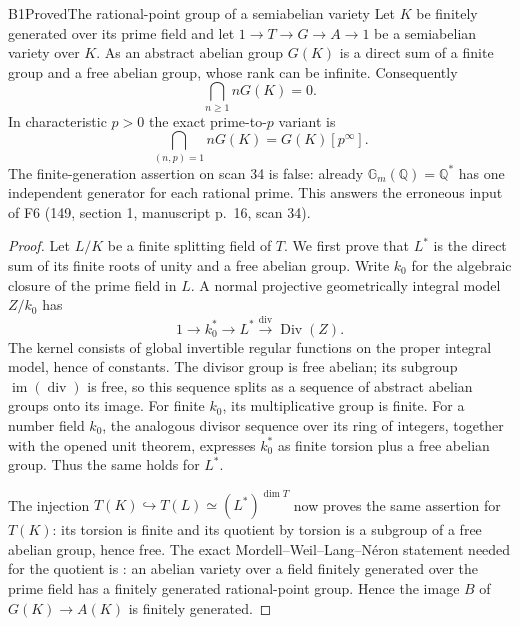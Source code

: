 \begin{result}{B1}{Proved}{The rational-point group of a semiabelian variety}
\label{res:B1}
Let $K$ be finitely generated over its prime field and let
$1\to T\to G\to A\to1$ be a semiabelian variety over $K$.
As an abstract abelian group $G(K)$ is a direct sum of a finite group and
a free abelian group, whose rank can be infinite. Consequently
\[
 \bigcap_{n\geq1}nG(K)=0.
\]
In characteristic $p>0$ the exact prime-to-$p$ variant is
\[
 \bigcap_{(n,p)=1}nG(K)=G(K)[p^\infty].
\]
The finite-generation assertion on scan 34 is false: already
$\mathbb G_m(\mathbb Q)=\mathbb Q^*$ has one independent generator for
each rational prime. This answers the erroneous input of F6 (149,
section 1, manuscript p.~16, scan 34).
\end{result}
\begin{proof}
Let $L/K$ be a finite splitting field of $T$. We first prove that
$L^*$ is the direct sum of its finite roots of unity and a free abelian
group. Write $k_0$ for the algebraic closure of the prime field in $L$.
A normal projective geometrically integral model $Z/k_0$ has
\[
 1\longrightarrow k_0^*\longrightarrow L^*
 \xrightarrow{\operatorname{div}}\operatorname{Div}(Z).
\]
The kernel consists of global invertible regular functions on the proper
integral model, hence of constants. The divisor group is free abelian;
its subgroup $\operatorname{im}(\operatorname{div})$ is free, so this
sequence splits as a sequence of abstract abelian groups onto its image.
For finite $k_0$, its multiplicative group is finite. For a number field
$k_0$, the analogous divisor sequence over its ring of integers, together
with the opened unit theorem\cite[Theorem 5.1]{AB_MilneANT}, expresses $k_0^*$ as finite torsion plus a free
abelian group. Thus the same holds for $L^*$.

The injection $T(K)\hookrightarrow T(L)\simeq(L^*)^{\dim T}$ now proves
the same assertion for $T(K)$: its torsion is finite and its quotient by
torsion is a subgroup of a free abelian group, hence free. The exact
Mordell--Weil--Lang--N\'eron statement needed for the quotient is
\cite[Theorem 16.7]{AB_MilneAV}: an abelian variety over a field finitely
generated over the prime field has a finitely generated rational-point
group. Hence the image $B$ of $G(K)\to A(K)$ is finitely generated.


\end{proof}
